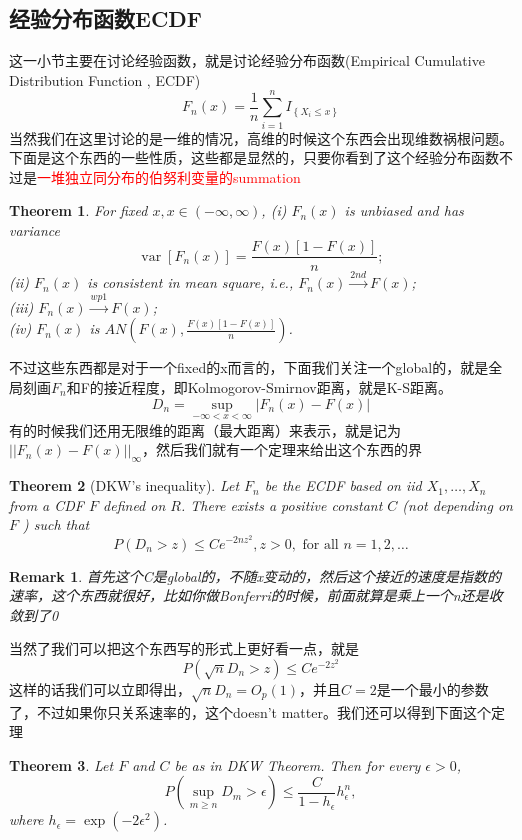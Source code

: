 \documentclass{article}
\newtheorem{theorem}{Theorem}[section]
\newtheorem{remark}{Remark}[theorem]
\begin{document}
\subsection{经验分布函数ECDF}
这一小节主要在讨论经验函数，就是讨论经验分布函数(Empirical Cumulative Distribution Function , ECDF)
$$
F_n(x)=\frac{1}{n} \sum_{i=1}^n I_{\left\{X_i \leq x\right\}}
$$
当然我们在这里讨论的是一维的情况，高维的时候这个东西会出现维数祸根问题。下面是这个东西的一些性质，这些都是显然的，只要你看到了这个经验分布函数不过是\textcolor{red}{一堆独立同分布的伯努利变量的summation}
\begin{theorem}
	For fixed $x, x \in(-\infty, \infty)$,
	(i) $F_n(x)$ is unbiased and has variance
	$$
	\operatorname{var}\left[F_n(x)\right]=\frac{F(x)[1-F(x)]}{n} ;
	$$
	(ii) $F_n(x)$ is consistent in mean square, i.e., $F_n(x) \stackrel{2 n d}{\rightarrow} F(x)$;\\
	(iii) $F_n(x) \stackrel{w p 1}{\rightarrow} F(x)$;\\
	(iv) $F_n(x)$ is $A N\left(F(x), \frac{F(x)[1-F(x)]}{n}\right)$.
\end{theorem}
不过这些东西都是对于一个fixed的x而言的，下面我们关注一个global的，就是全局刻画$F_n$和F的接近程度，即Kolmogorov-Smirnov距离，就是K-S距离。
$$
D_n=\sup_{-\infty<x<\infty}|F_n(x)-F(x)|
$$
有的时候我们还用无限维的距离（最大距离）来表示，就是记为$\vert\vert F_n(x)-F(x)\vert\vert_{\infty}$，然后我们就有一个定理来给出这个东西的界
\begin{theorem}[DKW's inequality]
	 Let $F_n$ be the ECDF based on iid $X_1, \ldots, X_n$ from a CDF $F$ defined on $R$. There exists a positive constant $C$ (not depending on $F$ ) such that
	$$
	P\left(D_n>z\right) \leq C e^{-2 n z^2}, z>0, \text { for all } n=1,2, \ldots
	$$
\end{theorem}
\begin{remark}
	首先这个C是global的，不随x变动的，然后这个接近的速度是指数的速率，这个东西就很好，比如你做Bonferri的时候，前面就算是乘上一个n还是收敛到了0
\end{remark}
当然了我们可以把这个东西写的形式上更好看一点，就是
$$
P(\sqrt{n}D_n>z)\leq Ce^{-2z^2}
$$
这样的话我们可以立即得出，$\sqrt{n}D_n=O_p(1)$，并且$C=2$是一个最小的参数了，不过如果你只关系速率的，这个doesn't matter。我们还可以得到下面这个定理
\begin{theorem}
	Let $F$ and $C$ be as in DKW Theorem. Then for every $\epsilon>0$,
	$$
	P\left(\sup _{m \geq n} D_m>\epsilon\right) \leq \frac{C}{1-h_\epsilon} h_\epsilon^n,
	$$
	where $h_\epsilon=\exp \left(-2 \epsilon^2\right)$.
\end{theorem}
\end{document}
